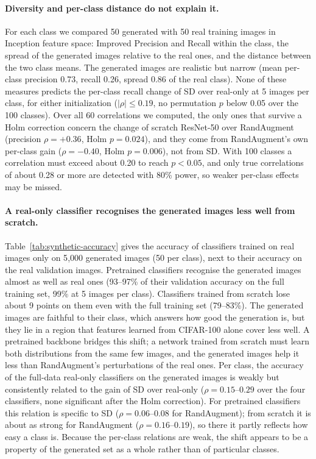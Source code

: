 \paragraph{Diversity and per-class distance do not explain it.}
For each class we compared 50 generated with 50 real training images in Inception feature space:
Improved Precision and Recall within the class, the spread of the generated images relative to the real
ones, and the distance between the two class means. The generated images are realistic but narrow
(mean per-class precision 0.73, recall 0.26, spread 0.86 of the real class). None of these measures
predicts the per-class recall change of SD over real-only at 5 images per class, for either
initialization ($|\rho| \le 0.19$, no permutation $p$ below 0.05 over the 100 classes). Over all 60
correlations we computed, the only ones that survive a Holm correction concern the change
of scratch ResNet-50 over RandAugment (precision $\rho = +0.36$, Holm $p = 0.024$), and they come from
RandAugment's own per-class gain ($\rho = -0.40$, Holm $p = 0.006$), not from SD. With 100 classes a
correlation must exceed about 0.20 to reach $p < 0.05$, and only true correlations of about 0.28 or more
are detected with 80\% power, so weaker per-class effects may be missed.

\paragraph{A real-only classifier recognises the generated images less well from scratch.}
Table~\ref{tab:synthetic-accuracy} gives the accuracy of classifiers trained on real images only on
5{,}000 generated images (50 per class), next to their accuracy on the real validation images. Pretrained
classifiers recognise the generated images almost as well as real ones (93--97\% of their validation
accuracy on the full training set, 99\% at 5 images per class). Classifiers trained from scratch lose
about 9 points on them even with the full training set (79--83\%). The generated images are faithful to
their class, which answers how good the generation is, but they lie in a region that features learned
from CIFAR-100 alone cover less well. A pretrained backbone bridges this shift; a network trained from
scratch must learn both distributions from the same few images, and the generated images help it less
than RandAugment's perturbations of the real ones. Per class, the accuracy of the full-data real-only
classifiers on the generated images is weakly but consistently related to the gain of SD over real-only
($\rho = 0.15$--$0.29$ over the four classifiers, none significant after the Holm correction). For
pretrained classifiers this relation is specific to SD ($\rho = 0.06$--$0.08$ for RandAugment); from scratch
it is about as strong for RandAugment ($\rho = 0.16$--$0.19$), so there it partly reflects how easy a class
is. Because the per-class relations are weak, the shift appears to be a property of the generated set as a
whole rather than of particular classes.

